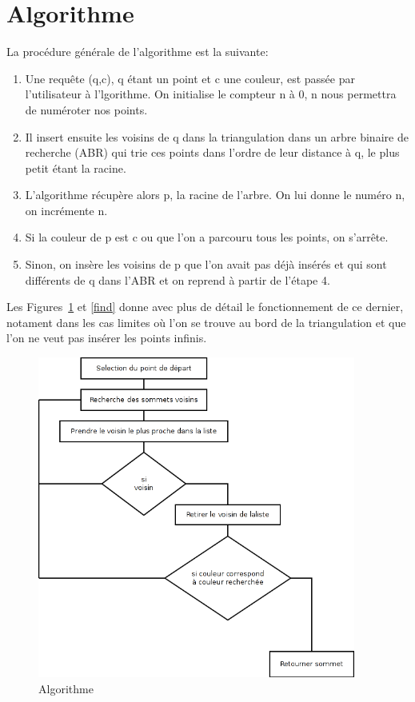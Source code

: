 \documentclass[a4paper, 11pt]{report}
\begin{document}
  \section*{Algorithme}
  La procédure générale de l'algorithme est la suivante:
  \begin{enumerate}
  \item Une requête (q,c), q étant un point et c une couleur, est passée par l'utilisateur à l'lgorithme. 
  On initialise le compteur n à 0, n nous permettra de numéroter nos points. 
  \item Il insert ensuite les voisins de q dans la triangulation dans un arbre binaire de recherche (ABR) qui trie
  ces points dans l'ordre de leur distance à q, le plus petit étant la racine. 
  \item L'algorithme récupère alors p, la racine de l'arbre. On lui donne le numéro n, on incrémente n. 
  \item Si la couleur de p est c ou que l'on a parcouru tous les points, on s'arrête. 
  \item Sinon, on insère les voisins de p que l'on avait pas déjà insérés et qui sont 
  différents de q dans l'ABR et on reprend à partir de l'étape 4.
  \end{enumerate}
  Les Figures~\ref{algo} et \ref{find} donne avec plus de détail le fonctionnement de ce dernier, notament 
  dans les cas limites où l'on se trouve au bord de la triangulation et que l'on ne veut pas insérer les points 
  infinis.

  	\begin{figure}[!h]
	\begin{center}
	\includegraphics[height=400px]{algo.png}
	\end{center}
	\caption[]{Algorithme}
	\label{algo}
	\end{figure}
\end{document}
